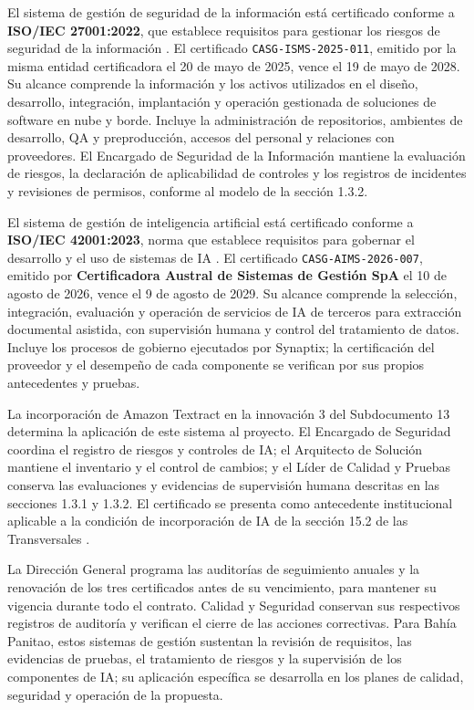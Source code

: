 El sistema de gestión de seguridad de la información está certificado conforme a \textbf{ISO/IEC 27001:2022}, que establece requisitos para gestionar los riesgos de seguridad de la información \parencite{iso27001}. El certificado \texttt{CASG-ISMS-2025-011}, emitido por la misma entidad certificadora el 20 de mayo de 2025, vence el 19 de mayo de 2028. Su alcance comprende la información y los activos utilizados en el diseño, desarrollo, integración, implantación y operación gestionada de soluciones de software en nube y borde. Incluye la administración de repositorios, ambientes de desarrollo, QA y preproducción, accesos del personal y relaciones con proveedores. El Encargado de Seguridad de la Información mantiene la evaluación de riesgos, la declaración de aplicabilidad de controles y los registros de incidentes y revisiones de permisos, conforme al modelo de la sección 1.3.2.

El sistema de gestión de inteligencia artificial está certificado conforme a \textbf{ISO/IEC 42001:2023}, norma que establece requisitos para gobernar el desarrollo y el uso de sistemas de IA \parencite{iso42001}. El certificado \texttt{CASG-AIMS-2026-007}, emitido por \textbf{Certificadora Austral de Sistemas de Gestión SpA} el 10 de agosto de 2026, vence el 9 de agosto de 2029. Su alcance comprende la selección, integración, evaluación y operación de servicios de IA de terceros para extracción documental asistida, con supervisión humana y control del tratamiento de datos. Incluye los procesos de gobierno ejecutados por Synaptix; la certificación del proveedor y el desempeño de cada componente se verifican por sus propios antecedentes y pruebas.

La incorporación de Amazon Textract en la innovación 3 del Subdocumento 13 determina la aplicación de este sistema al proyecto. El Encargado de Seguridad coordina el registro de riesgos y controles de IA; el Arquitecto de Solución mantiene el inventario y el control de cambios; y el Líder de Calidad y Pruebas conserva las evaluaciones y evidencias de supervisión humana descritas en las secciones 1.3.1 y 1.3.2. El certificado se presenta como antecedente institucional aplicable a la condición de incorporación de IA de la sección 15.2 de las Transversales \parencite[sec.~15.2, p.~28; RT-18.04, p.~32]{bases-transversales}.

La Dirección General programa las auditorías de seguimiento anuales y la renovación de los tres certificados antes de su vencimiento, para mantener su vigencia durante todo el contrato. Calidad y Seguridad conservan sus respectivos registros de auditoría y verifican el cierre de las acciones correctivas. Para Bahía Panitao, estos sistemas de gestión sustentan la revisión de requisitos, las evidencias de pruebas, el tratamiento de riesgos y la supervisión de los componentes de IA; su aplicación específica se desarrolla en los planes de calidad, seguridad y operación de la propuesta.


